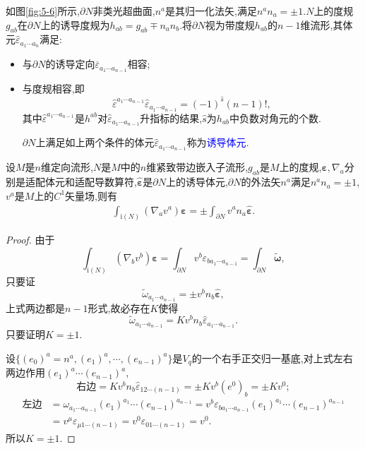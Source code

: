 如图\ref{fig:5-6}所示,$\partial N$非类光超曲面,$n^a$是其归一化法矢,满足$n^an_a=\pm 1.N$上的度规$g_{ab}$在$\partial N$上的诱导度规为$h_{ab}=g_{ab}\mp n_an_b .$将$\partial N$视为带度规$h_{ab}$的$n-1$维流形,其体元$\hat{\varepsilon}_{a_1\cdots a_n}$满足:
\begin{itemize}
    \item 与$\partial N$的诱导定向$\overline{\varepsilon}_{a_1\cdots a_{n-1}}$相容;
    \item 与度规相容,即$$\hat{\varepsilon}^{a_1\cdots a_{n-1}}\hat{\varepsilon}_{a_1\cdots a_{n-1}}=(-1)^{\hat{s}}(n-1)!,$$
    其中$\hat{\varepsilon}^{a_1\cdots a_{n-1}}$是$h^{ab}$对$\hat{\varepsilon}_{a_1\cdots a_{n-1}}$升指标的结果,$\hat{s}$为$h_{ab}$中负数对角元的个数.
    
    $\partial N$上满足如上两个条件的体元$\hat{\varepsilon}_{a_1\cdots a_{n-1}}$称为\textcolor{blue}{诱导体元}.
\end{itemize}
\newpage
设$M$是$n$维定向流形,$N$是$M$中的$n$维紧致带边嵌入子流形,$g_{ab}$是$M$上的度规,$\boldsymbol{\varepsilon},\nabla_a$分别是适配体元和适配导数算符,$\hat{\boldsymbol{\varepsilon}}$是$\partial N$上的诱导体元,$\partial N$的外法矢$n^a$满足$n^an_a=\pm 1$,$v^a$是$M$上的$C^1$矢量场,则有
\begin{align}
    \boxed{\int_{\text{i}(N)}(\nabla_av^a)\boldsymbol{\varepsilon}=\pm \int_{\partial N}v^an_a\hat{\boldsymbol{\varepsilon}}.}
\end{align}
\begin{proof}
    由于$$
    \int_{\text{i}(N)}(\nabla_bv^b)\boldsymbol{\varepsilon}=\int_{\partial N}v^b\varepsilon_{ba_1\cdots a_{n-1}}=\int_{\partial N}\tilde{\boldsymbol{\omega}},
    $$
    只要证$$\tilde{\omega}_{a_1\cdots a_{n-1}}=\pm v^bn_b
   \hat{\boldsymbol{\varepsilon}},
    $$
    上式两边都是$n-1$形式,故必存在$K$使得
    $$
    \tilde{\omega}_{a_1\cdots a_{n-1}}=K v^bn_b
   \hat{\varepsilon}_{a_1\cdots a_{n-1}}.
    $$
只要证明$K=\pm 1.$
    
设$\{(e_0)^a=n^a,(e_1)^a,\cdots,(e_{n-1})^a\}$是$V_q$的一个右手正交归一基底,对上式左右两边作用$(e_1)^a\cdots (e_{n-1})^a$,
    $$
    \text{右边}=Kv^bn_b\hat{\varepsilon}_{12\cdots (n-1)}=\pm Kv^b(e^0)_b=\pm Kv^0;
 $$
 $$
    \begin{aligned}
        \text{左边} &=\omega_{a_1\cdots a_{n-1}}(e_1)^{a_1}\cdots (e_{n-1})^{a_{n-1}}=v^b\varepsilon_{ba_1\cdots a_{n-1}}(e_1)^{a_1}\cdots (e_{n-1})^{a_{n-1}}\\
    &=v^\mu\varepsilon_{\mu 1\cdots (n-1)}=v^0\varepsilon_{01\cdots(n-1)}=v^0.
    \end{aligned}
    $$
    所以$K=\pm 1.$
\end{proof}

